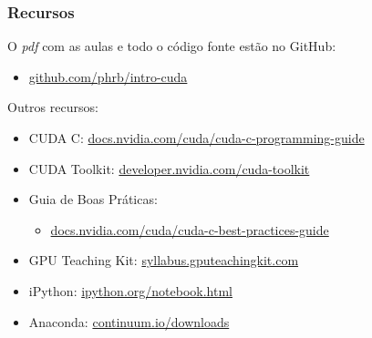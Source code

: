\documentclass[10pt, compress]{beamer}
\begin{document}
\begin{frame}
    \frametitle{Recursos}
    O \emph{pdf} com as aulas e todo o código fonte estão no \alert{GitHub}:

    \begin{itemize}
        \item \url{github.com/phrb/intro-cuda}
    \end{itemize}

    Outros recursos:

    \begin{itemize}
        \item CUDA C: \url{docs.nvidia.com/cuda/cuda-c-programming-guide}
        \item CUDA Toolkit: \url{developer.nvidia.com/cuda-toolkit}
        \item Guia de Boas Práticas:
            \begin{itemize}
                \item \url{docs.nvidia.com/cuda/cuda-c-best-practices-guide}
            \end{itemize}
        \item GPU Teaching Kit: \url{syllabus.gputeachingkit.com}
        \item iPython: \url{ipython.org/notebook.html}
        \item Anaconda: \url{continuum.io/downloads}
    \end{itemize}
\end{frame}

\maketitle
\end{document}
